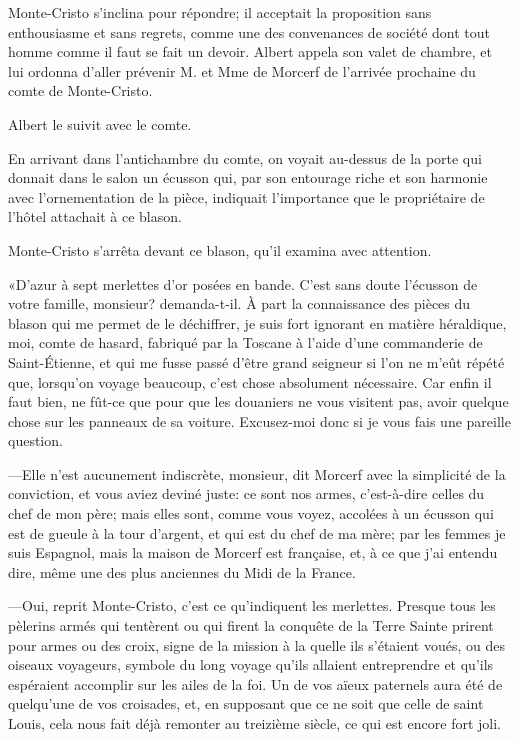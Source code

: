 Monte-Cristo s'inclina pour répondre; il acceptait la proposition sans enthousiasme et sans regrets, comme une des convenances de société dont tout homme comme il faut se fait un devoir. Albert appela son valet de chambre, et lui ordonna d'aller prévenir M. et Mme de Morcerf de l'arrivée prochaine du comte de Monte-Cristo. 

Albert le suivit avec le comte. 

En arrivant dans l'antichambre du comte, on voyait au-dessus de la porte qui donnait dans le salon un écusson qui, par son entourage riche et son harmonie avec l'ornementation de la pièce, indiquait l'importance que le propriétaire de l'hôtel attachait à ce blason. 

Monte-Cristo s'arrêta devant ce blason, qu'il examina avec attention. 

«D'azur à sept merlettes d'or posées en bande. C'est sans doute l'écusson de votre famille, monsieur? demanda-t-il. À part la connaissance des pièces du blason qui me permet de le déchiffrer, je suis fort ignorant en matière héraldique, moi, comte de hasard, fabriqué par la Toscane à l'aide d'une commanderie de Saint-Étienne, et qui me fusse passé d'être grand seigneur si l'on ne m'eût répété que, lorsqu'on voyage beaucoup, c'est chose absolument nécessaire. Car enfin il faut bien, ne fût-ce que pour que les douaniers ne vous visitent pas, avoir quelque chose sur les panneaux de sa voiture. Excusez-moi donc si je vous fais une pareille question. 

—Elle n'est aucunement indiscrète, monsieur, dit Morcerf avec la simplicité de la conviction, et vous aviez deviné juste: ce sont nos armes, c'est-à-dire celles du chef de mon père; mais elles sont, comme vous voyez, accolées à un écusson qui est de gueule à la tour d'argent, et qui est du chef de ma mère; par les femmes je suis Espagnol, mais la maison de Morcerf est française, et, à ce que j'ai entendu dire, même une des plus anciennes du Midi de la France. 

—Oui, reprit Monte-Cristo, c'est ce qu'indiquent les merlettes. Presque tous les pèlerins armés qui tentèrent ou qui firent la conquête de la Terre Sainte prirent pour armes ou des croix, signe de la mission à la quelle ils s'étaient voués, ou des oiseaux voyageurs, symbole du long voyage qu'ils allaient entreprendre et qu'ils espéraient accomplir sur les ailes de la foi. Un de vos aïeux paternels aura été de quelqu'une de vos croisades, et, en supposant que ce ne soit que celle de saint Louis, cela nous fait déjà remonter au treizième siècle, ce qui est encore fort joli. 

